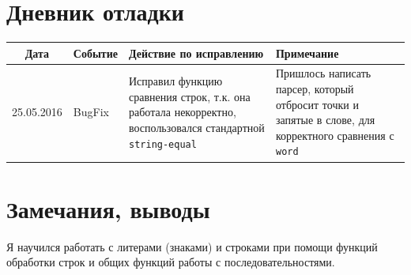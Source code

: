 \documentclass[12pt]{article}
\begin{document}
%

\section{Дневник отладки}
\begin{tabular}{|c|p{5cm}|p{5cm}|p{3cm}|}
\hline
Дата & Событие & Действие по исправлению & Примечание \\
\hline
25.05.2016 & BugFix & Исправил функцию сравнения строк, т.к. она работала некорректно, воспользовался стандартной {\color{red}\tt{string-equal}} & Пришлось написать парсер, который отбросит точки и запятые в слове, для корректного сравнения с {\color{blue}\tt{word}}\\
\hline 
\end{tabular}

\section{Замечания, выводы}
Я научился работать с литерами (знаками) и строками при помощи функций обработки строк и общих функций работы с последовательностями.
\end{document}
